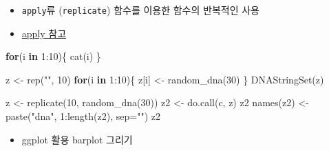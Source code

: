 \documentclass[
]{book}
\newenvironment{Shaded}{\begin{snugshade}}{\end{snugshade}}
\newcommand{\AttributeTok}[1]{\textcolor[rgb]{0.77,0.63,0.00}{#1}}
\newcommand{\ControlFlowTok}[1]{\textcolor[rgb]{0.13,0.29,0.53}{\textbf{#1}}}
\newcommand{\DecValTok}[1]{\textcolor[rgb]{0.00,0.00,0.81}{#1}}
\newcommand{\FunctionTok}[1]{\textcolor[rgb]{0.00,0.00,0.00}{#1}}
\newcommand{\NormalTok}[1]{#1}
\newcommand{\OtherTok}[1]{\textcolor[rgb]{0.56,0.35,0.01}{#1}}
\newcommand{\SpecialCharTok}[1]{\textcolor[rgb]{0.00,0.00,0.00}{#1}}
\newcommand{\StringTok}[1]{\textcolor[rgb]{0.31,0.60,0.02}{#1}}
\providecommand{\tightlist}{%
  \setlength{\itemsep}{0pt}\setlength{\parskip}{0pt}}
\begin{document}
\begin{itemize}
\tightlist
\item
  \texttt{apply}류 (\texttt{replicate}) 함수를 이용한 함수의 반복적인 사용
\item
  \href{https://greendaygh.github.io/kribbr2022/data-transformation.html\#apply}{apply 참고}
\end{itemize}

\begin{Shaded}
\begin{Highlighting}[]

\ControlFlowTok{for}\NormalTok{(i }\ControlFlowTok{in} \DecValTok{1}\SpecialCharTok{:}\DecValTok{10}\NormalTok{)\{}
  \FunctionTok{cat}\NormalTok{(i)}
\NormalTok{\}}

\NormalTok{z }\OtherTok{\textless{}{-}} \FunctionTok{rep}\NormalTok{(}\StringTok{""}\NormalTok{, }\DecValTok{10}\NormalTok{)}
\ControlFlowTok{for}\NormalTok{(i }\ControlFlowTok{in} \DecValTok{1}\SpecialCharTok{:}\DecValTok{10}\NormalTok{)\{}
\NormalTok{  z[i] }\OtherTok{\textless{}{-}} \FunctionTok{random\_dna}\NormalTok{(}\DecValTok{30}\NormalTok{)}
\NormalTok{\}}
\FunctionTok{DNAStringSet}\NormalTok{(z)}


\NormalTok{z }\OtherTok{\textless{}{-}} \FunctionTok{replicate}\NormalTok{(}\DecValTok{10}\NormalTok{, }\FunctionTok{random\_dna}\NormalTok{(}\DecValTok{30}\NormalTok{))}
\NormalTok{z2 }\OtherTok{\textless{}{-}} \FunctionTok{do.call}\NormalTok{(c, z)}
\NormalTok{z2}
\FunctionTok{names}\NormalTok{(z2) }\OtherTok{\textless{}{-}} \FunctionTok{paste}\NormalTok{(}\StringTok{"dna"}\NormalTok{, }\DecValTok{1}\SpecialCharTok{:}\FunctionTok{length}\NormalTok{(z2), }\AttributeTok{sep=}\StringTok{""}\NormalTok{)}
\NormalTok{z2}
\end{Highlighting}
\end{Shaded}

\begin{itemize}
\tightlist
\item
  ggplot 활용 barplot 그리기
\end{itemize}
\end{document}
